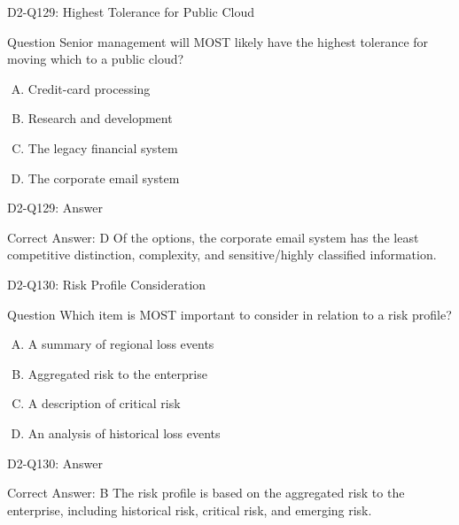 \documentclass{beamer}
\begin{document}
	\begin{frame}{D2-Q129: Highest Tolerance for Public Cloud}
		\begin{block}{Question}
			Senior management will MOST likely have the highest tolerance for moving which to a public cloud?
		\end{block}
		\begin{enumerate}[(A)]
			\item Credit-card processing
			\item Research and development
			\item The legacy financial system
			\item The corporate email system
		\end{enumerate}
	\end{frame}
	\begin{frame}{D2-Q129: Answer}
		\begin{block}{Correct Answer: D}
			Of the options, the corporate email system has the least competitive distinction, complexity, and sensitive/highly classified information.
		\end{block}
	\end{frame}
	
	\begin{frame}{D2-Q130: Risk Profile Consideration}
		\begin{block}{Question}
			Which item is MOST important to consider in relation to a risk profile?
		\end{block}
		\begin{enumerate}[(A)]
			\item A summary of regional loss events
			\item Aggregated risk to the enterprise
			\item A description of critical risk
			\item An analysis of historical loss events
		\end{enumerate}
	\end{frame}
	\begin{frame}{D2-Q130: Answer}
		\begin{block}{Correct Answer: B}
			The risk profile is based on the aggregated risk to the enterprise, including historical risk, critical risk, and emerging risk.
		\end{block}
	\end{frame}
	
\end{document}
